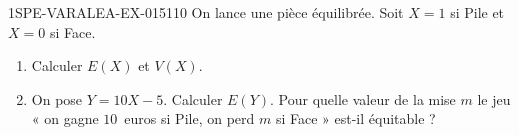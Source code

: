 \begin{exercice}{1SPE-VARALEA-EX-015}{1}{10}
On lance une pièce équilibrée. Soit $X = 1$ si Pile et $X = 0$ si Face.

\begin{enumerate}
  \item Calculer $E(X)$ et $V(X)$.
  \item On pose $Y = 10X - 5$. Calculer $E(Y)$. Pour quelle valeur de la mise $m$ le jeu « on gagne $10$~euros si Pile, on perd $m$ si Face » est-il équitable ?
\end{enumerate}
\end{exercice}
